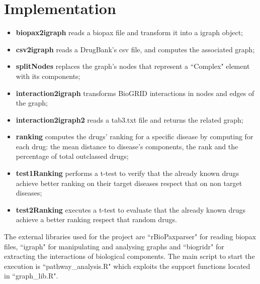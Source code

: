 \chapter{Implementation}\label{chap:implementation}

\begin{itemize}
    \item \textbf{biopax2igraph} reads a biopax file and transform it into a igraph object;
    \item \textbf{csv2igraph} reads a DrugBank's csv file, and computes the associated graph;
    \item \textbf{splitNodes} replaces the graph's nodes that represent a ``Complex" element with its components;
    \item \textbf{interaction2igraph} transforms BioGRID\cite{biogrid} interactions in nodes and edges of the graph;
    \item \textbf{interaction2igraph2} reads a tab3.txt file and returns the related graph;
    \item \textbf{ranking} computes the drugs' ranking for a specific disease by computing for each drug: the mean distance to disease's components, the rank and the percentage of total outclassed drugs;
    \item \textbf{test1Ranking} performs a t-test to verify that the already known drugs achieve better ranking on their target diseases respect that on non target diseases;
    \item \textbf{test2Ranking} executes a t-test to evaluate that the already known drugs achieve a better ranking respect that random drugs.
\end{itemize}

The external libraries used for the project are ``rBioPaxparser"\cite{rbiopax} for reading biopax files, ``igraph"\cite{igraph} for manipulating and analysing graphs and ``biogridr"\cite{biogridr} for extracting the interactions of biological components. The main script to start the execution is ``pathway\_analysis.R" which exploits the support functions located in ``graph\_lib.R".